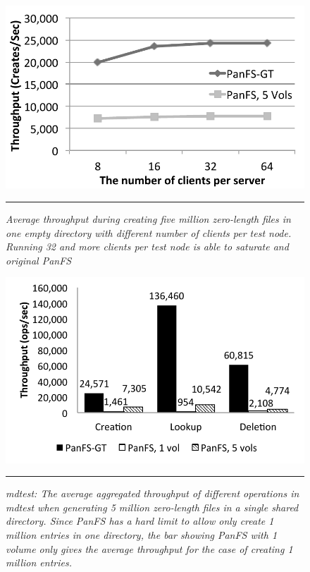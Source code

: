 \begin{figure}[t]  %
\centerline{\includegraphics[scale=0.7]{./figs/zero_file_creation_on_panfs}}
\vspace{10pt}
\caption{\normalsize
\textit{Average throughput during creating five million zero-length files
in one empty directory with different number of clients per test node.
Running 32 and more clients per test node is able to saturate \psys
and original PanFS}
}
\vspace{10pt}
\hrule
\label{graph:creation_clients}
\end{figure}       %

\begin{figure}[t]  %
\centerline{\includegraphics[scale=0.7]{./figs/mdtest}}
\vspace{10pt}
\caption{\normalsize
\textit{mdtest:
The average aggregated throughput of different operations in mdtest
when generating 5 million zero-length files in a single shared directory.
Since PanFS has a hard limit to allow only create 1 million entries
in one directory, the bar showing PanFS with 1 volume only gives
the average throughput for the case of creating 1 million entries.
}
}
\vspace{10pt}
\hrule
\label{graph:mdtest_ops}
\end{figure}       %


